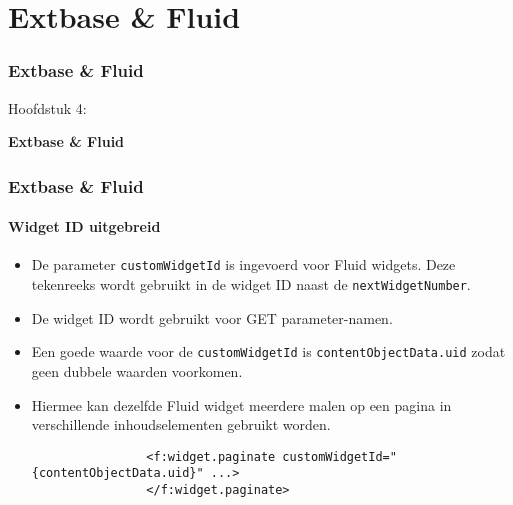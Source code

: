 %

\section{Extbase \& Fluid}
\begin{frame}[fragile]
	\frametitle{Extbase \& Fluid}

	\begin{center}\huge{Hoofdstuk 4:}\end{center}
	\begin{center}\huge{\color{typo3darkgrey}\textbf{Extbase \& Fluid}}\end{center}

\end{frame}


\begin{frame}[fragile]
	\frametitle{Extbase \& Fluid}
	\framesubtitle{Widget ID uitgebreid}

	\begin{itemize}
		\item De parameter \texttt{customWidgetId} is ingevoerd voor Fluid widgets.
			Deze tekenreeks wordt gebruikt in de widget ID naast de \texttt{nextWidgetNumber}.

		\item De widget ID wordt gebruikt voor GET parameter-namen.

		\item Een goede waarde voor de \texttt{customWidgetId} is \texttt{{contentObjectData.uid}} zodat geen dubbele waarden voorkomen.

		\item Hiermee kan dezelfde Fluid widget meerdere malen op een pagina in verschillende inhoudselementen gebruikt worden.

			\begin{lstlisting}
				<f:widget.paginate customWidgetId="{contentObjectData.uid}" ...>
				</f:widget.paginate>
			\end{lstlisting}

	\end{itemize}

\end{frame}

